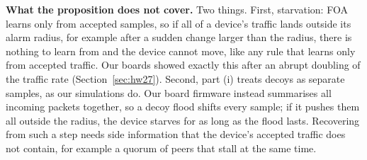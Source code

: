 \textbf{What the proposition does not cover.} Two things. First, starvation: FOA learns only from
accepted samples, so if all of a device's traffic lands outside its alarm radius, for example after a
sudden change larger than the radius, there is nothing to learn from and the device cannot move, like
any rule that learns only from accepted traffic. Our boards showed exactly this after an abrupt doubling
of the traffic rate (Section~\ref{sec:hw27}). Second, part (i) treats decoys as separate samples, as our
simulations do. Our board firmware instead summarises all incoming packets together, so a decoy flood
shifts every sample; if it pushes them all outside the radius, the device starves for as long as the
flood lasts. Recovering from such a step needs side information that the device's accepted traffic does
not contain, for example a quorum of peers that stall at the same time.
